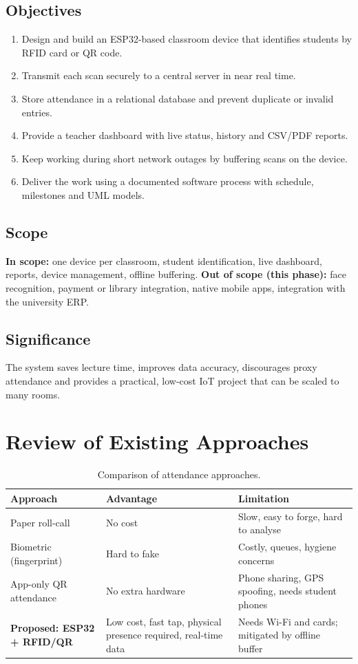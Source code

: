 \documentclass[11pt,a4paper]{article}
\begin{document}
\subsection{Objectives}
\begin{enumerate}[noitemsep]
  \item Design and build an ESP32-based classroom device that identifies students by RFID card or QR code.
  \item Transmit each scan securely to a central server in near real time.
  \item Store attendance in a relational database and prevent duplicate or invalid entries.
  \item Provide a teacher dashboard with live status, history and CSV/PDF reports.
  \item Keep working during short network outages by buffering scans on the device.
  \item Deliver the work using a documented software process with schedule, milestones and UML models.
\end{enumerate}
 
\subsection{Scope}
\textbf{In scope:} one device per classroom, student identification, live dashboard, reports, device management, offline buffering.
\textbf{Out of scope (this phase):} face recognition, payment or library integration, native mobile apps, integration with the university ERP.
 
\subsection{Significance}
The system saves lecture time, improves data accuracy, discourages proxy attendance and provides a practical, low-cost IoT project that can be scaled to many rooms.
 
\section{Review of Existing Approaches}
\begin{table}[H]
\centering
\small
\begin{tabular}{p{3.2cm}p{4.2cm}p{4.8cm}}
\toprule
\textbf{Approach} & \textbf{Advantage} & \textbf{Limitation}\\
\midrule
Paper roll-call & No cost & Slow, easy to forge, hard to analyse\\
Biometric (fingerprint) & Hard to fake & Costly, queues, hygiene concerns\\
App-only QR attendance & No extra hardware & Phone sharing, GPS spoofing, needs student phones\\
\textbf{Proposed: ESP32 + RFID/QR} & Low cost, fast tap, physical presence required, real-time data & Needs Wi-Fi and cards; mitigated by offline buffer\\
\bottomrule
\end{tabular}
\caption{Comparison of attendance approaches.}
\end{table}
 
\end{document}
